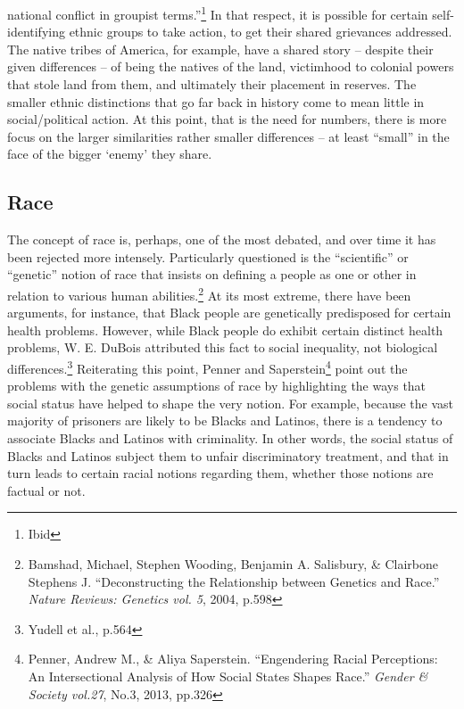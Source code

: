 \documentclass[11pt]{article}
\begin{document}
national conflict in groupist terms.”\footnote{Ibid} In that respect, it is possible for certain self-identifying ethnic groups to take action, to get their shared grievances addressed. The native tribes of America, for example, have a shared story – despite their given differences – of being the natives of the land, victimhood to colonial powers that stole land from them, and ultimately their placement in reserves. The smaller ethnic distinctions that go far back in history come to mean little in social/political action. At this point, that is the need for numbers, there is more focus on the larger similarities rather smaller differences – at least “small” in the face of the bigger ‘enemy’ they share.

\subsection{Race}

The concept of race is, perhaps, one of the most debated, and over time it has been rejected more intensely. Particularly questioned is the “scientific” or “genetic” notion of race that insists on defining a people as one or other in relation to various human abilities.\footnote{Bamshad, Michael, Stephen Wooding, Benjamin A. Salisbury, \& Clairbone Stephens J. “Deconstructing the Relationship between Genetics and Race.” \textit{Nature Reviews: Genetics vol. 5}, 2004, p.598} At its most extreme, there have been arguments, for instance, that Black people are genetically predisposed for certain health problems. However, while Black people do exhibit certain distinct health problems, W. E. DuBois attributed this fact to social inequality, not biological differences.\footnote{Yudell et al., p.564} Reiterating this point, Penner and Saperstein\footnote{Penner, Andrew M., \& Aliya Saperstein. “Engendering Racial Perceptions: An Intersectional Analysis of How Social States Shapes Race.” \textit{Gender \& Society vol.27}, No.3, 2013, pp.326} point out the problems with the genetic assumptions of race by highlighting the ways that social status have helped to shape the very notion. For example, because the vast majority of prisoners are likely to be Blacks and Latinos, there is a tendency to associate Blacks and Latinos with criminality. In other words, the social status of Blacks and Latinos subject them to unfair discriminatory treatment, and that in turn leads to certain racial notions regarding them, whether those notions are factual or not.
\end{document}
